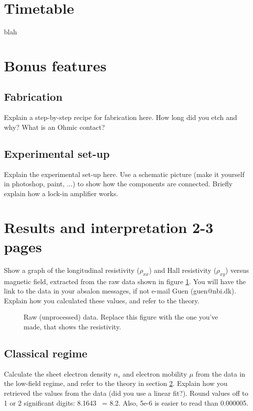 \documentclass[a4paper]{article}
\begin{document}
\section{Timetable}
blah

\section{Bonus features}
\label{sec:bonus}
\subsection{Fabrication}
Explain a step-by-step recipe for fabrication here. How long did you etch and why? What is an Ohmic contact?
\subsection{Experimental set-up}
Explain the experimental set-up here. Use a schematic picture (make it yourself in photoshop, paint, ...) to show how the components are connected. Briefly explain how a lock-in amplifier works.
      
\newpage
\section{Results and interpretation 2-3 pages}
Show a graph of the longitudinal resistivity ($\rho_{xx}$) and Hall resistivity ($\rho_{xy}$) versus magnetic field, extracted from the raw data shown in figure \ref{fig:data}. You will have the link to the data in your absalon messages, if not e-mail Guen (guen@nbi.dk). Explain how you calculated these values, and refer to the theory.
      
\begin{figure}
	\centering
	\caption{\label{fig:data}Raw (unprocessed) data. Replace this figure with the one you've made, that shows the resistivity.}
\end{figure}
      
\subsection{Classical regime}
Calculate the sheet electron density $n_{s}$ and electron mobility $\mu$ from the data in the low-field regime, and refer to the theory in section \ref{sec:bonus}. Explain how you retrieved the values from the data (did you use a linear fit?).
Round values off to 1 or 2 significant digits: 8.1643 ~= 8.2. Also, 5e-6 is easier to read than 0.000005.
      
\end{document}
